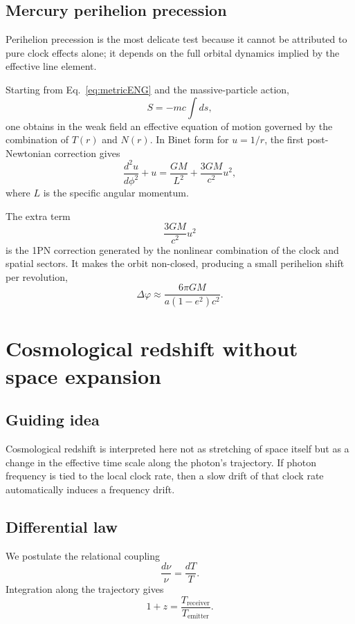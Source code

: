 \documentclass[11pt,a4paper]{article}
\begin{document}
\subsection{Mercury perihelion precession}
Perihelion precession is the most delicate test because it cannot be attributed to pure clock effects alone; it depends on the full orbital dynamics implied by the effective line element.

Starting from Eq.~\eqref{eq:metricENG} and the massive-particle action,
\begin{equation}
 S = -mc\int ds,
\end{equation}
one obtains in the weak field an effective equation of motion governed by the combination of $T(r)$ and $N(r)$. In Binet form for $u=1/r$, the first post-Newtonian correction gives
\begin{equation}
\frac{d^2u}{d\phi^2} + u = \frac{GM}{L^2} + \frac{3GM}{c^2}u^2,
\end{equation}
where $L$ is the specific angular momentum.

The extra term
\begin{equation}
\frac{3GM}{c^2}u^2
\end{equation}
is the 1PN correction generated by the nonlinear combination of the clock and spatial sectors. It makes the orbit non-closed, producing a small perihelion shift per revolution,
\begin{equation}
\boxed{
\Delta \varphi \approx \frac{6\pi GM}{a(1-e^2)c^2}.
}
\end{equation}

\section{Cosmological redshift without space expansion}
\subsection{Guiding idea}
Cosmological redshift is interpreted here not as stretching of space itself but as a change in the effective time scale along the photon's trajectory. If photon frequency is tied to the local clock rate, then a slow drift of that clock rate automatically induces a frequency drift.

\subsection{Differential law}
We postulate the relational coupling
\begin{equation}
 \frac{d\nu}{\nu} = \frac{dT}{T}.
\end{equation}
Integration along the trajectory gives
\begin{equation}
\boxed{
 1+z = \frac{T_{\text{receiver}}}{T_{\text{emitter}}}.
}
\end{equation}
\end{document}
